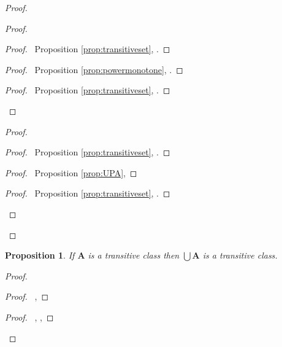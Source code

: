 \documentclass{book}
\let\qed\relax
\newtheorem{prop}[ax]{Proposition}
\theoremstyle{definition}
\begin{document}
\begin{proof}
\pf
{}
\begin{proof}
	\begin{proof}
		\pf\ Proposition \ref{prop:transitiveset}, .
	\end{proof}
	\begin{proof}
		\pf\ Proposition \ref{prop:powermonotone}, .
	\end{proof}
	\begin{proof}
		\pf\ Proposition \ref{prop:transitiveset}, .
	\end{proof}
\end{proof}
\begin{proof}
	\begin{proof}
		\pf\ Proposition \ref{prop:transitiveset}, .
	\end{proof}
	\begin{proof}
		\pf\ Proposition \ref{prop:UPA}, 
	\end{proof}
	\begin{proof}
		\pf\ Proposition \ref{prop:transitiveset}, .
	\end{proof}
\end{proof}
\qed
\end{proof}

\begin{prop}
\label{prop:uniontransitive}
If $\mathbf{A}$ is a transitive class then $\bigcup \mathbf{A}$ is a transitive class.
\end{prop}

\begin{proof}
\pf
{}
\begin{proof}
	\pf\ , 
\end{proof}
\begin{proof}
	\pf\ , , 
\end{proof}
\qed
\end{proof}
\end{document}
